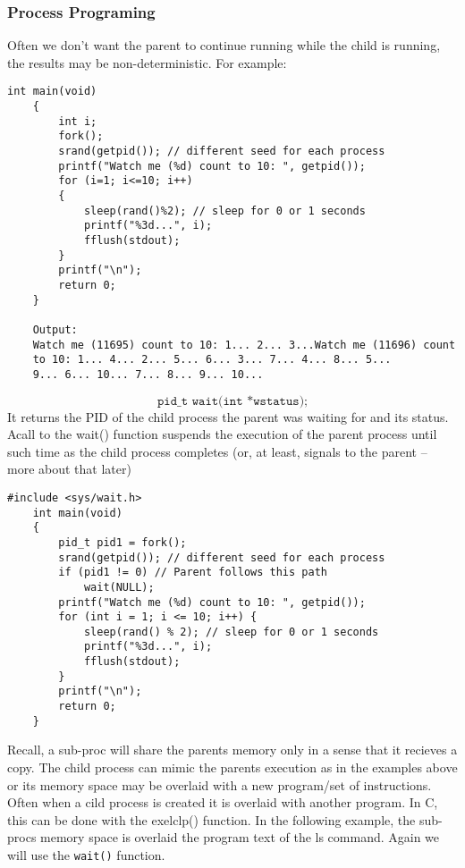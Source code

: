 \documentclass[a4paper, 10pt]{article}
\begin{document}
\subsubsection{Process Programing}
Often we don't want the parent to continue running while the child is running, the results may be non-deterministic. For example:
\begin{lstlisting}[style=cStyle, caption={Unpredictable a process}]
    int main(void)
    {
        int i;
        fork();
        srand(getpid()); // different seed for each process
        printf("Watch me (%d) count to 10: ", getpid());
        for (i=1; i<=10; i++)
        {
            sleep(rand()%2); // sleep for 0 or 1 seconds
            printf("%3d...", i);
            fflush(stdout);
        }
        printf("\n");
        return 0;
    }

    Output:
    Watch me (11695) count to 10: 1... 2... 3...Watch me (11696) count
    to 10: 1... 4... 2... 5... 6... 3... 7... 4... 8... 5...
    9... 6... 10... 7... 8... 9... 10...
\end{lstlisting}
$$\texttt{pid\_t wait(int *wstatus);}$$
It returns the PID of the child process the parent was waiting for and its status. Acall to the wait() function suspends the execution of the parent
process until such time as the child process completes (or, at least,
signals to the parent – more about that later)
\begin{lstlisting}[style=cStyle, caption={Wait for a process}]
    #include <sys/wait.h>
    int main(void)
    {
        pid_t pid1 = fork();
        srand(getpid()); // different seed for each process
        if (pid1 != 0) // Parent follows this path
            wait(NULL);
        printf("Watch me (%d) count to 10: ", getpid());
        for (int i = 1; i <= 10; i++) {
            sleep(rand() % 2); // sleep for 0 or 1 seconds
            printf("%3d...", i);
            fflush(stdout);
        }
        printf("\n");
        return 0;
    }
\end{lstlisting}
Recall, a sub-proc will share the parents memory only in a sense that it recieves a copy. The  child process can mimic the parents execution as in the examples above or its memory space may be overlaid with a new program/set of instructions. \\
Often when a cild process is created it is overlaid with another program. In C, this can be done with the {exelclp()} function. In the following example, the sub-procs memory space is overlaid the program text of the ls command.  Again we will use the \texttt{wait()} function.
\end{document}
